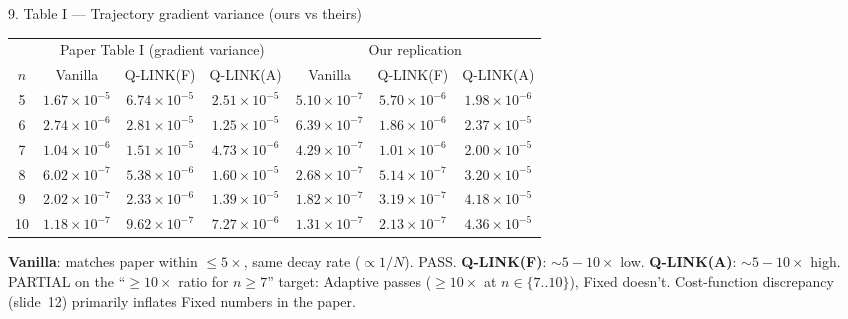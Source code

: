 \documentclass[10pt, aspectratio=169]{beamer}
\newcommand{\theirs}[1]{\textcolor{theirs}{#1}}
\newcommand{\ours}[1]{\textcolor{ours}{#1}}
\begin{document}
\begin{frame}{9. Table I — Trajectory gradient variance (ours vs theirs)}
    \scriptsize\centering
    \begin{tabular}{c|ccc|ccc}\toprule
    & \multicolumn{3}{c|}{\theirs{Paper Table I (gradient variance)}}
    & \multicolumn{3}{c}{\ours{Our replication}} \\
    $n$ & Vanilla & Q-LINK(F) & Q-LINK(A) & Vanilla & Q-LINK(F) & Q-LINK(A) \\\midrule
    5 & \theirs{$1.67\!\times\!10^{-5}$} & \theirs{$6.74\!\times\!10^{-5}$} & \theirs{$2.51\!\times\!10^{-5}$} & \ours{$5.10\!\times\!10^{-7}$} & \ours{$5.70\!\times\!10^{-6}$} & \ours{$1.98\!\times\!10^{-6}$} \\
    6 & \theirs{$2.74\!\times\!10^{-6}$} & \theirs{$2.81\!\times\!10^{-5}$} & \theirs{$1.25\!\times\!10^{-5}$} & \ours{$6.39\!\times\!10^{-7}$} & \ours{$1.86\!\times\!10^{-6}$} & \ours{$2.37\!\times\!10^{-5}$} \\
    7 & \theirs{$1.04\!\times\!10^{-6}$} & \theirs{$1.51\!\times\!10^{-5}$} & \theirs{$4.73\!\times\!10^{-6}$} & \ours{$4.29\!\times\!10^{-7}$} & \ours{$1.01\!\times\!10^{-6}$} & \ours{$2.00\!\times\!10^{-5}$} \\
    8 & \theirs{$6.02\!\times\!10^{-7}$} & \theirs{$5.38\!\times\!10^{-6}$} & \theirs{$1.60\!\times\!10^{-5}$} & \ours{$2.68\!\times\!10^{-7}$} & \ours{$5.14\!\times\!10^{-7}$} & \ours{$3.20\!\times\!10^{-5}$} \\
    9 & \theirs{$2.02\!\times\!10^{-7}$} & \theirs{$2.33\!\times\!10^{-6}$} & \theirs{$1.39\!\times\!10^{-5}$} & \ours{$1.82\!\times\!10^{-7}$} & \ours{$3.19\!\times\!10^{-7}$} & \ours{$4.18\!\times\!10^{-5}$} \\
    10 & \theirs{$1.18\!\times\!10^{-7}$} & \theirs{$9.62\!\times\!10^{-7}$} & \theirs{$7.27\!\times\!10^{-6}$} & \ours{$1.31\!\times\!10^{-7}$} & \ours{$2.13\!\times\!10^{-7}$} & \ours{$4.36\!\times\!10^{-5}$} \\
    \bottomrule
    \end{tabular}
    \vspace{0.3em}\small
    \textbf{Vanilla}: matches \theirs{paper} within $\le 5\times$, same decay rate ($\propto 1/N$). \textcolor{pass}{PASS}.
    \textbf{Q-LINK(F)}: $\sim 5\!-\!10\times$ low. \textbf{Q-LINK(A)}: $\sim 5\!-\!10\times$ high.
    \textcolor{flag}{PARTIAL} on the ``$\ge 10\times$ ratio for $n \ge 7$'' target: Adaptive passes ($\ge 10\times$ at $n \in \{7..10\}$), Fixed doesn't.
    Cost-function discrepancy (slide~12) primarily inflates Fixed numbers in the paper.
\end{frame}
\end{document}
